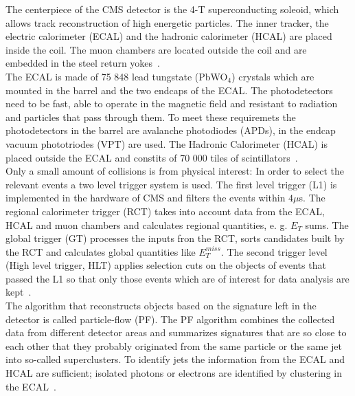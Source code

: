The centerpiece of the CMS detector is the 4-T superconducting soleoid, which allows track reconstruction of high energetic particles. The inner tracker,
the electric calorimeter (ECAL) and the hadronic calorimeter (HCAL) are placed inside the coil. The muon chambers are located outside the coil and are embedded in the steel return yokes~\cite{CMS:2008}. \\

The ECAL is made of 75 848 lead tungstate (PbWO$_4$) crystals which are mounted in the barrel and the two endcaps of the ECAL. The photodetectors need to be fast, able to operate in the magnetic field and
resistant to radiation and particles that pass through them. To meet these requiremets the photodetectors in the barrel are avalanche photodiodes (APDs), in the endcap vacuum phototriodes (VPT) are used.
The Hadronic Calorimeter (HCAL) is placed outside the ECAL and constits of 70 000 tiles of scintillators~\cite{CMS:2008}. \\

Only a small amount of collisions is from physical interest: In order to select the relevant events a two level trigger system is used. The first level trigger (L1) is implemented in the hardware of CMS and filters the events
within $4 \mu$s. The regional calorimeter trigger (RCT) takes into account data from the ECAL, HCAL and muon chambers and calculates regional quantities, e. g. $E_T$ sums. The global trigger (GT) processes the inputs fron the RCT,
sorts candidates built by the RCT and calculates global quantities like $E_T^{miss}$. The second trigger level (High level trigger, HLT) applies selection cuts on the objects of events that passed the L1 so that only those events which
are of interest for data analysis are kept~\cite{CMS:2017trg}. \\

The algorithm that reconstructs objects based on the signature left in the detector is called particle-flow (PF). The PF algorithm combines the collected data from different detector areas and summarizes signatures that are so close to
each other that they probably originated from the same particle or the same jet into so-called superclusters. To identify jets the information from the ECAL and HCAL are sufficient; isolated photons or electrons are identified by clustering in the ECAL~\cite{CMS:2017pf}.



